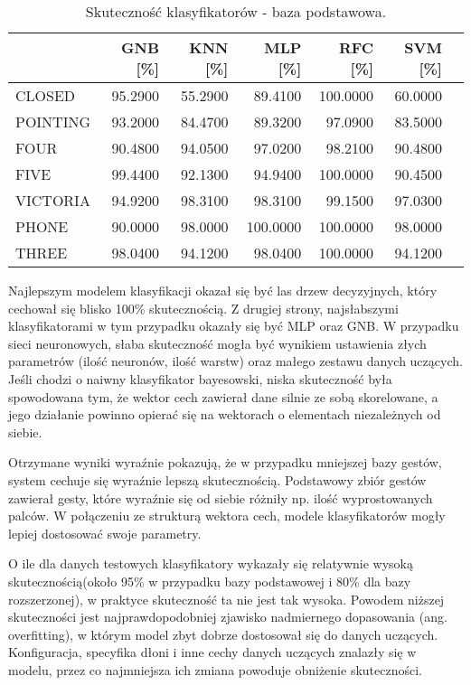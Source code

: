 \begin{table}[!htbp]
\centering
\caption{Skuteczność klasyfikatorów - baza podstawowa.}
\label{table:simple_results}
\begin{tabular}{l|rrrrrr}
 & GNB [\%] & KNN [\%] & MLP [\%] & RFC [\%] & SVM [\%] \\ \hline
CLOSED & 95.2900 & 55.2900 & 89.4100 & 100.0000 & 60.0000 \\
POINTING & 93.2000 & 84.4700 & 89.3200 & 97.0900 & 83.5000 \\
FOUR & 90.4800 & 94.0500 & 97.0200 & 98.2100 & 90.4800 \\
FIVE & 99.4400 & 92.1300 & 94.9400 & 100.0000 & 90.4500 \\
VICTORIA & 94.9200 & 98.3100 & 98.3100 & 99.1500 & 97.0300 \\
PHONE & 90.0000 & 98.0000 & 100.0000 & 100.0000 & 98.0000 \\
THREE & 98.0400 & 94.1200 & 98.0400 & 100.0000 & 94.1200 \\
\end{tabular}
\end{table}

Najlepszym modelem klasyfikacji okazał się być las drzew decyzyjnych, który cechował się blisko 100\% skutecznością. Z drugiej strony, najsłabszymi klasyfikatorami w tym przypadku okazały się być MLP oraz GNB. W przypadku sieci neuronowych, słaba skuteczność mogła być wynikiem ustawienia złych parametrów (ilość neuronów, ilość warstw) oraz małego zestawu danych uczących. Jeśli chodzi o naiwny klasyfikator bayesowski, niska skuteczność była spowodowana tym, że wektor cech zawierał dane silnie ze sobą skorelowane, a jego działanie powinno opierać się na wektorach o elementach niezależnych od siebie.

Otrzymane wyniki wyraźnie pokazują, że w przypadku mniejszej bazy gestów, system cechuje się wyraźnie lepszą skutecznością. Podstawowy zbiór gestów zawierał gesty, które wyraźnie się od siebie różniły np. ilość wyprostowanych palców. W połączeniu ze strukturą wektora cech, modele klasyfikatorów mogły lepiej dostosować swoje parametry.

O ile dla danych testowych klasyfikatory wykazały się relatywnie wysoką skutecznością(około 95\% w przypadku bazy podstawowej i 80\% dla bazy rozszerzonej), w praktyce skuteczność ta nie jest tak wysoka. Powodem niższej skuteczności jest najprawdopodobniej zjawisko nadmiernego dopasowania (ang. overfitting), w którym model zbyt dobrze dostosował się do danych uczących. Konfiguracja, specyfika dłoni i inne cechy danych uczących znalazły się w modelu, przez co najmniejsza ich zmiana powoduje obniżenie skuteczności.

